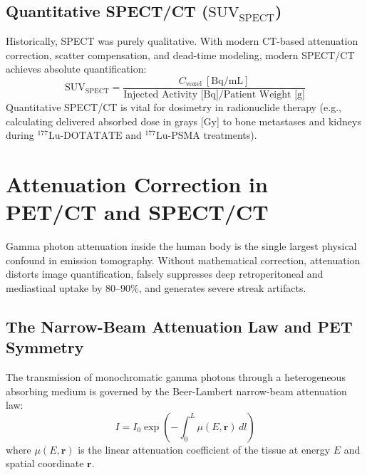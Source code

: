 \documentclass[11pt,a4paper]{article}
\begin{document}
\subsection{Quantitative SPECT/CT (\texorpdfstring{$\text{SUV}_{\text{SPECT}}$}{SUV-SPECT})}
Historically, SPECT was purely qualitative. With modern CT-based attenuation correction, scatter compensation, and dead-time modeling, modern SPECT/CT achieves absolute quantification:
\begin{equation}
    \text{SUV}_{\text{SPECT}} = \frac{C_{\text{voxel}} \ [\text{Bq/mL}]}{\text{Injected Activity [Bq]} / \text{Patient Weight [g]}}
\end{equation}
Quantitative SPECT/CT is vital for dosimetry in radionuclide therapy (e.g., calculating delivered absorbed dose in grays [Gy] to bone metastases and kidneys during $^{177}\text{Lu}\text{-DOTATATE}$ and $^{177}\text{Lu}\text{-PSMA}$ treatments).

\section{Attenuation Correction in PET/CT and SPECT/CT}
Gamma photon attenuation inside the human body is the single largest physical confound in emission tomography. Without mathematical correction, attenuation distorts image quantification, falsely suppresses deep retroperitoneal and mediastinal uptake by $80\text{--}90\%$, and generates severe streak artifacts.

\subsection{The Narrow-Beam Attenuation Law and PET Symmetry}
The transmission of monochromatic gamma photons through a heterogeneous absorbing medium is governed by the Beer-Lambert narrow-beam attenuation law:
\begin{equation}
    I = I_0 \exp\left( -\int_0^L \mu(E, \mathbf{r}) \, dl \right)
\end{equation}
where $\mu(E, \mathbf{r})$ is the linear attenuation coefficient of the tissue at energy $E$ and spatial coordinate $\mathbf{r}$.
\end{document}
